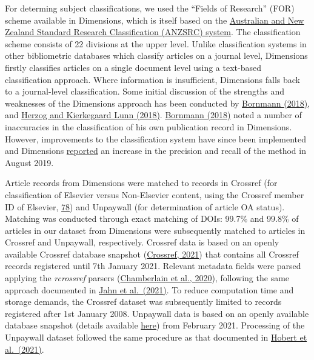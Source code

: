 \documentclass[
]{article}
\begin{document}
For determing subject classifications, we used the ``Fields of Research'' (FOR) scheme available in Dimensions, which is itself based on the \href{https://dimensions.freshdesk.com/support/solutions/articles/23000018826-what-is-the-background-behind-the-fields-of-research-for-classification-system-}{Australian and New Zealand Standard Research Classification (ANZSRC) system}. The classification scheme consists of 22 divisions at the upper level. Unlike classification systems in other bibliometric databases which classify articles on a journal level, Dimensions firstly classifies articles on a single document level using a text-based classification approach. Where information is insufficient, Dimensions falls back to a journal-level classification. Some initial discussion of the strengths and weaknesses of the Dimensions approach has been conducted by \href{https://doi.org/10.1007/s11192-018-2855-y}{Bornmann (2018)}, and \href{https://doi.org/10.1007/s11192-018-2854-z}{Herzog and Kierkegaard Lunn (2018)}. \href{https://doi.org/10.1007/s11192-018-2855-y}{Bornmann (2018)} noted a number of inaccuracies in the classification of his own publication record in Dimensions. However, improvements to the classification system have since been implemented and Dimensions \href{https://www.dimensions.ai/release-notes/}{reported} an increase in the precision and recall of the method in August 2019.

Article records from Dimensions were matched to records in Crossref (for classification of Elsevier versus Non-Elsevier content, using the Crossref member ID of Elsevier, \href{https://www.crossref.org/members/prep/78}{78}) and Unpaywall (for determination of article OA status). Matching was conducted through exact matching of DOIs: 99.7\% and 99.8\% of articles in our dataset from Dimensions were subsequently matched to articles in Crossref and Unpaywall, respectively. Crossref data is based on an openly available Crossref database snapshot (\href{https://academictorrents.com/details/e4287cb7619999709f6e9db5c359dda17e93d515}{Crossref, 2021}) that contains all Crossref records registered until 7th January 2021. Relevant metadata fields were parsed applying the \emph{rcrossref} parsers (\href{https://CRAN.R-project.org/package=rcrossref}{Chamberlain et al., 2020}), following the same approach documented in \href{https://arxiv.org/abs/2102.04789}{Jahn et al.~(2021)}. To reduce computation time and storage demands, the Crossref dataset was subsequently limited to records registered after 1st January 2008. Unpaywall data is based on an openly available database snapshot (details available \href{https://unpaywall.org/products/snapshot}{here}) from February 2021. Processing of the Unpaywall dataset followed the same procedure as that documented in \href{https://edoc.hu-berlin.de/handle/18452/23336}{Hobert et al.~(2021)}.
\end{document}
